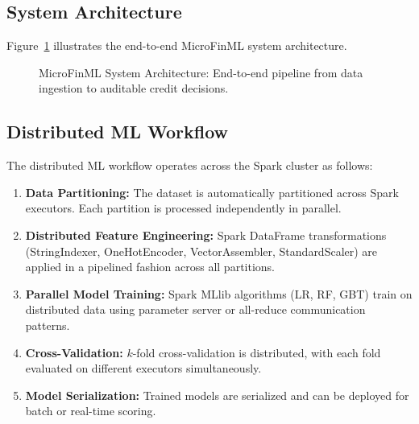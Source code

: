 \documentclass[preprint,12pt,authoryear]{elsarticle}
\begin{document}
\subsection{System Architecture}

Figure~\ref{fig:architecture} illustrates the end-to-end MicroFinML system architecture.

\begin{figure}[htbp]
    \centering
    \caption{MicroFinML System Architecture: End-to-end pipeline from data ingestion to auditable credit decisions.}
    \label{fig:architecture}
\end{figure}

\subsection{Distributed ML Workflow}

The distributed ML workflow operates across the Spark cluster as follows:

\begin{enumerate}
    \item \textbf{Data Partitioning:} The dataset is automatically partitioned across Spark executors. Each partition is processed independently in parallel.
    \item \textbf{Distributed Feature Engineering:} Spark DataFrame transformations (StringIndexer, OneHotEncoder, VectorAssembler, StandardScaler) are applied in a pipelined fashion across all partitions.
    \item \textbf{Parallel Model Training:} Spark MLlib algorithms (LR, RF, GBT) train on distributed data using parameter server or all-reduce communication patterns.
    \item \textbf{Cross-Validation:} $k$-fold cross-validation is distributed, with each fold evaluated on different executors simultaneously.
    \item \textbf{Model Serialization:} Trained models are serialized and can be deployed for batch or real-time scoring.
\end{enumerate}
\end{document}
